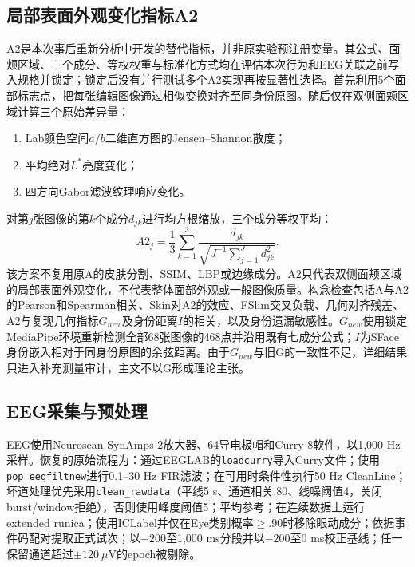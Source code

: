 \documentclass[preprint,12pt,authoryear]{elsarticle}
\begin{document}
\subsection{局部表面外观变化指标A2}

A2是本次事后重新分析中开发的替代指标，并非原实验预注册变量。其公式、面颊区域、三个成分、等权权重与标准化方式均在评估本次行为和EEG关联之前写入规格并锁定；锁定后没有并行测试多个A2实现再按显著性选择。首先利用5个面部标志点，把每张编辑图像通过相似变换对齐至同身份原图。随后仅在双侧面颊区域计算三个原始差异量：

\begin{enumerate}[label=(\arabic*),leftmargin=2em]
  \item Lab颜色空间$a/b$二维直方图的Jensen--Shannon散度；
  \item 平均绝对$L^*$亮度变化；
  \item 四方向Gabor滤波纹理响应变化。
\end{enumerate}

对第$j$张图像的第$k$个成分$d_{jk}$进行均方根缩放，三个成分等权平均：
\begin{equation}
  A2_j=\frac{1}{3}\sum_{k=1}^{3}
  \frac{d_{jk}}{\sqrt{J^{-1}\sum_{j=1}^{J}d_{jk}^{2}}}.
  \label{eq:a2}
\end{equation}
该方案不复用原A的皮肤分割、SSIM、LBP或边缘成分。A2只代表双侧面颊区域的局部表面外观变化，不代表整体面部外观或一般图像质量。构念检查包括A与A2的Pearson和Spearman相关、Skin对A2的效应、FSlim交叉负载、几何对齐残差、A2与复现几何指标$G_{new}$及身份距离$I$的相关，以及身份遗漏敏感性。$G_{new}$使用锁定MediaPipe环境重新检测全部68张图像的468点并沿用既有七成分公式；$I$为SFace身份嵌入相对于同身份原图的余弦距离。由于$G_{new}$与旧G的一致性不足，详细结果只进入补充测量审计，主文不以G形成理论主张\citep{Lugaresi2019}。

\subsection{EEG采集与预处理}

EEG使用Neuroscan SynAmps 2放大器、64导电极帽和Curry 8软件，以1,000 Hz采样。恢复的原始流程为：通过EEGLAB的\texttt{loadcurry}导入Curry文件；使用\texttt{pop\_eegfiltnew}进行0.1--30 Hz FIR滤波；在可用时条件性执行50 Hz CleanLine；坏道处理优先采用\texttt{clean\_rawdata}（平线5 s、通道相关$.80$、线噪阈值4，关闭burst/window拒绝），否则使用峰度阈值5；平均参考；在连续数据上运行extended runica；使用ICLabel并仅在Eye类别概率$\geq .90$时移除眼动成分；依据事件码配对提取正式试次；以$-200$至1,000 ms分段并以$-200$至0 ms校正基线；任一保留通道超过$\pm120\ \mu$V的epoch被剔除。
\end{document}
